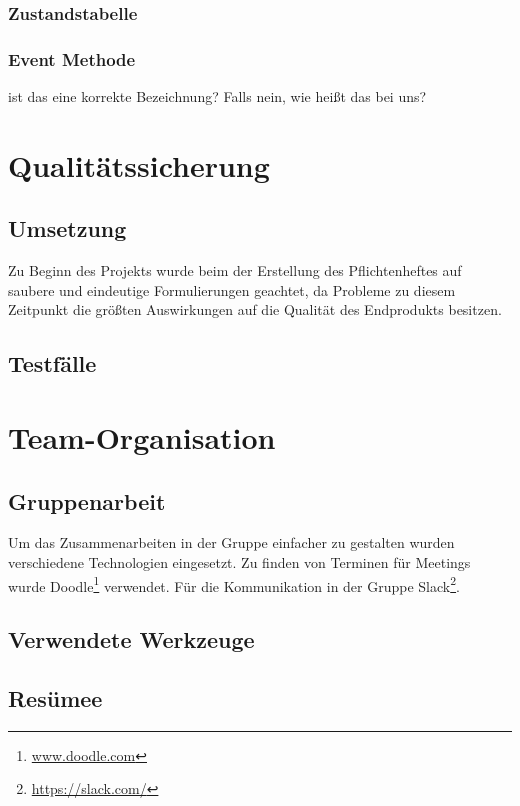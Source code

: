 \subsection*{Zustandstabelle}
\subsection*{Event Methode}
ist das eine korrekte Bezeichnung? Falls nein, wie heißt das bei uns?


\chapter{Qualitätssicherung}
\section{Umsetzung}
Zu Beginn des Projekts wurde beim der Erstellung des Pflichtenheftes auf saubere und eindeutige Formulierungen geachtet, da Probleme zu diesem Zeitpunkt die größten Auswirkungen auf die Qualität des Endprodukts besitzen.
\section{Testfälle}


\chapter{Team-Organisation}
\section{Gruppenarbeit}
Um das Zusammenarbeiten in der Gruppe einfacher zu gestalten wurden verschiedene Technologien eingesetzt.
Zu finden von Terminen für Meetings wurde Doodle\footnote{\url{www.doodle.com}}  verwendet. Für die Kommunikation in der Gruppe Slack\footnote{\url{https://slack.com/}}.
\section{Verwendete Werkzeuge}
\section{Resümee}